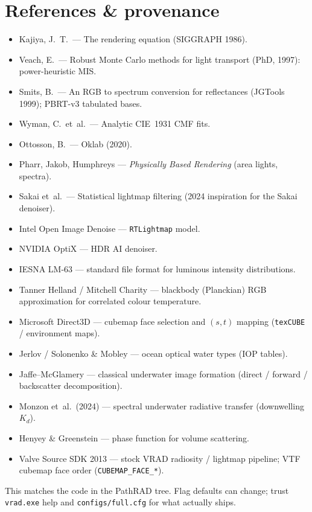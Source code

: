 \documentclass[11pt,a4paper]{article}
\newcommand{\code}[1]{\texttt{#1}}
\begin{document}
\section*{References \& provenance}

\begin{itemize}[leftmargin=1.4em]
  \item Kajiya, J.~T.\ --- The rendering equation (SIGGRAPH 1986).
  \item Veach, E.\ --- Robust Monte Carlo methods for light transport (PhD, 1997):
        power-heuristic MIS.
  \item Smits, B.\ --- An RGB to spectrum conversion for reflectances (JGTools 1999);
        PBRT-v3 tabulated bases.
  \item Wyman, C.\ et~al.\ --- Analytic CIE~1931 CMF fits.
  \item Ottosson, B.\ --- Oklab (2020).
  \item Pharr, Jakob, Humphreys --- \emph{Physically Based Rendering} (area lights, spectra).
  \item Sakai et~al.\ --- Statistical lightmap filtering (2024 inspiration for the Sakai denoiser).
  \item Intel Open Image Denoise --- \code{RTLightmap} model.
  \item NVIDIA OptiX --- HDR AI denoiser.
  \item IESNA LM-63 --- standard file format for luminous intensity distributions.
  \item Tanner Helland / Mitchell Charity --- blackbody (Planckian) RGB approximation
        for correlated colour temperature.
  \item Microsoft Direct3D --- cubemap face selection and $(s,t)$ mapping
        (\code{texCUBE} / environment maps).
  \item Jerlov / Solonenko \& Mobley --- ocean optical water types (IOP tables).
  \item Jaffe--McGlamery --- classical underwater image formation (direct /
        forward / backscatter decomposition).
  \item Monzon et~al.\ (2024) --- spectral underwater radiative transfer
        (downwelling $K_d$).
  \item Henyey \& Greenstein --- phase function for volume scattering.
  \item Valve Source SDK 2013 --- stock VRAD radiosity / lightmap pipeline;
        VTF cubemap face order (\code{CUBEMAP\_FACE\_*}).
\end{itemize}

\vspace{1.5em}
{\color{cvMuted}\footnotesize
\noindent
This matches the code in the PathRAD tree.
Flag defaults can change; trust \texttt{vrad.exe} help and
\texttt{configs/full.cfg} for what actually ships.
}
\end{document}
